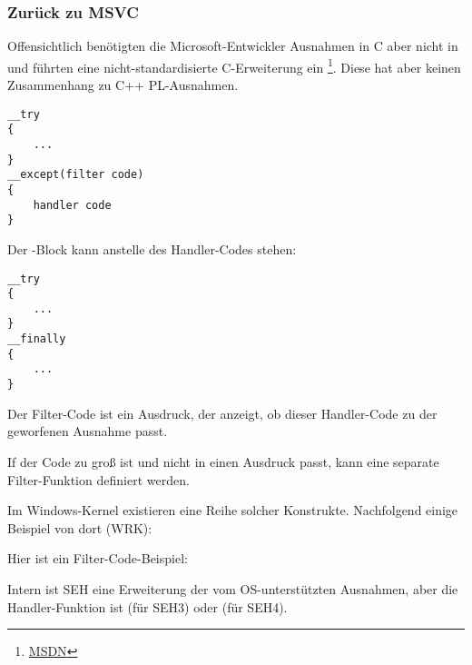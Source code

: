 \subsubsection{Zurück zu MSVC}

Offensichtlich benötigten die Microsoft-Entwickler Ausnahmen in C aber nicht in
\Cpp und führten eine nicht-standardisierte C-Erweiterung ein \footnote{\href{http://go.yurichev.com/17057}{MSDN}}.
Diese hat aber keinen Zusammenhang zu  C++ \ac{PL}-Ausnahmen.

\begin{lstlisting}[style=customc]
__try
{
    ...
}
__except(filter code)
{
    handler code
}
\end{lstlisting}

Der -Block kann anstelle des Handler-Codes stehen:

\begin{lstlisting}[style=customc]
__try
{
    ...
}
__finally
{
    ...
}
\end{lstlisting}

Der Filter-Code ist ein Ausdruck, der anzeigt, ob dieser Handler-Code zu der
geworfenen Ausnahme passt.

If der Code zu groß ist und nicht in einen Ausdruck passt, kann eine separate
Filter-Funktion definiert werden.

Im Windows-Kernel existieren eine Reihe solcher Konstrukte.
Nachfolgend einige Beispiel von dort (\ac{WRK}):





Hier ist ein Filter-Code-Beispiel:



Intern ist SEH eine Erweiterung der vom \ac{OS}-unterstützten Ausnahmen,
aber die Handler-Funktion ist  (für SEH3) oder  (für SEH4).

